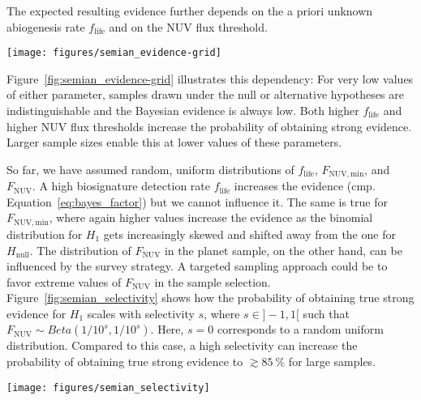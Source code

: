 \documentclass[twocolumn,twocolappendix,linenumbers]{aastex631}
\begin{document}
The expected resulting evidence further depends on the a priori unknown abiogenesis rate $f_\mathrm{life}$ and on the \gls{NUV} flux threshold.
\begin{figure*}
    \begin{centering}
        \texttt{[image: figures/semian\_evidence-grid]}
        \caption{Probability of obtaining true strong evidence for different abiogenesis rates, \gls{NUV} flux thresholds, and sample sizes. For each of these parameters, higher values increase the probability of yielding strong evidence.}
        \label{fig:semian_evidence-grid}
    \end{centering}
\end{figure*}
Figure~\ref{fig:semian_evidence-grid} illustrates this dependency: For very low values of either parameter, samples drawn under the null or alternative hypotheses are indistinguishable and the Bayesian evidence is always low.
Both higher $f_\mathrm{life}$ and higher \gls{NUV} flux thresholds increase the probability of obtaining strong evidence.
Larger sample sizes enable this at lower values of these parameters.


So far, we have assumed random, uniform distributions of $f_\mathrm{life}$, $F_\mathrm{NUV, min}$, and $F_\mathrm{NUV}$.
A high biosignature detection rate $f_\mathrm{life}$ increases the evidence (cmp. Equation~\ref{eq:bayes_factor}) but we cannot influence it.
The same is true for $F_\mathrm{NUV, min}$, where again higher values increase the evidence as the binomial distribution for $H_\mathrm{1}$ gets increasingly skewed and shifted away from the one for $H_\mathrm{null}$.
The distribution of $F_\mathrm{NUV}$ in the planet sample, on the other hand, can be influenced by the survey strategy.
A targeted sampling approach could be to favor extreme values of $F_\mathrm{NUV}$ in the sample selection.
Figure~\ref{fig:semian_selectivity} shows how the probability of obtaining true strong evidence for $H_\mathrm{1}$ scales with selectivity $s$, where $s\in]-1,1[$ such that $F_\mathrm{NUV} \sim Beta(1/10^s,1/10^s)$.
Here, $s=0$ corresponds to a random uniform distribution.
Compared to this case, a high selectivity can increase the probability of obtaining true strong evidence to $\gtrsim \SI{85}{\percent}$ for large samples.

\begin{figure*}
    \begin{centering}
        \texttt{[image: figures/semian\_selectivity]}
        \caption{Scaling of the probability of obtaining true strong evidence with sample selectivity. Left: Sampling distribution for different selectivity parameters $s$. Right: Resulting \mbox{P(true strong evidence)} (random, uniform $f_\mathrm{life}$, $F_\mathrm{NUV, min}$). Sampling more extreme values of $F_\mathrm{NUV}$ is more likely to yield strong evidence.}
        \label{fig:semian_selectivity}
    \end{centering}
\end{figure*}
\end{document}
